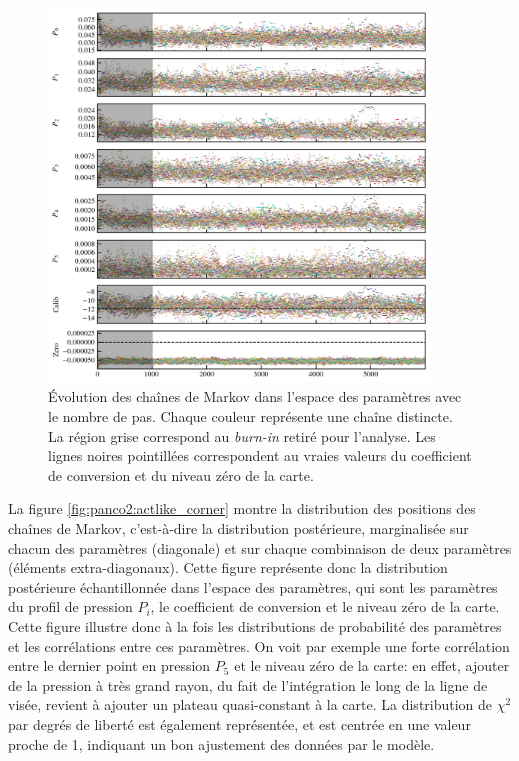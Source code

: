 \begin{figure}[t]
    \centering
    \includegraphics[width=0.9\textwidth]{Figures/Chap_panco/demo_plots/chains.png}
    \caption{
        Évolution des chaînes de Markov dans l'espace des paramètres avec le nombre de pas.
        Chaque couleur représente une chaîne distincte.
        La région grise correspond au \textit{burn-in} retiré pour l'analyse.
        Les lignes noires pointillées correspondent au vraies valeurs du coefficient de conversion et du niveau zéro de la carte.
    }
    \label{fig:panco2:actlike_chains}
\end{figure}

La figure \ref{fig:panco2:actlike_corner} montre la distribution des positions des chaînes de Markov, c'est-à-dire la distribution postérieure, marginalisée sur chacun des paramètres (diagonale) et sur chaque combinaison de deux paramètres (éléments extra-diagonaux).
Cette figure représente donc la distribution postérieure échantillonnée dans l'espace des paramètres, qui sont les paramètres du profil de pression $P_i$, le coefficient de conversion et le niveau zéro de la carte.
Cette figure illustre donc à la fois les distributions de probabilité des paramètres et les corrélations entre ces paramètres.
On voit par exemple une forte corrélation entre le dernier point en pression $P_5$ et le niveau zéro de la carte: en effet, ajouter de la pression à très grand rayon, du fait de l'intégration le long de la ligne de visée, revient à ajouter un plateau quasi-constant à la carte.
La distribution de $\chi^2$ par degrés de liberté est également représentée, et est centrée en une valeur proche de 1, indiquant un bon ajustement des données par le modèle.

